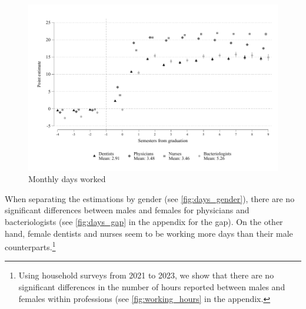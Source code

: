\documentclass[12pt, a4paper]{article}
\begin{document}
\begin{figure}[H]
\caption{Monthly days worked}\label{fig:days}
\centering 
\includegraphics[width=\textwidth]{Figures/Callaway SantAnna/ES_sal_dias_cot_0_all.pdf}
\end{figure}

When separating the estimations by gender (see \autoref{fig:days_gender}), there are no significant differences between males and females for physicians and bacteriologists (see \autoref{fig:days_gap} in the appendix for the gap). On the other hand, female dentists and nurses seem to be working more days than their male counterparts.\footnote{ Using household surveys from 2021 to 2023, we show that there are no significant differences in the number of hours reported between males and females within professions (see \autoref{fig:working_hours} in the appendix.}
\end{document}
